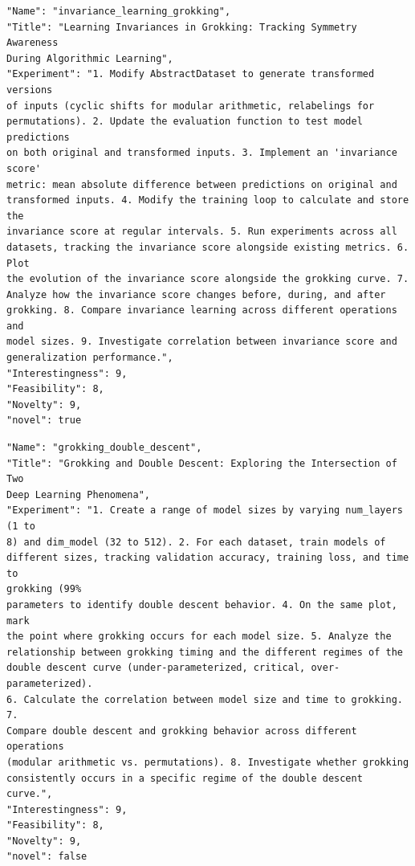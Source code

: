\documentclass[11pt, a4paper]{include/gdm_format}
\begin{document}
\begin{tcolorbox}[breakable,colback=blue!5!white, colframe=blue!75!black, title=Idea 23/50 - \texttt{invariance\_learning\_grokking}]
\small
\begin{verbatim}
"Name": "invariance_learning_grokking",
"Title": "Learning Invariances in Grokking: Tracking Symmetry Awareness
During Algorithmic Learning",
"Experiment": "1. Modify AbstractDataset to generate transformed versions
of inputs (cyclic shifts for modular arithmetic, relabelings for
permutations). 2. Update the evaluation function to test model predictions
on both original and transformed inputs. 3. Implement an 'invariance score'
metric: mean absolute difference between predictions on original and
transformed inputs. 4. Modify the training loop to calculate and store the
invariance score at regular intervals. 5. Run experiments across all
datasets, tracking the invariance score alongside existing metrics. 6. Plot
the evolution of the invariance score alongside the grokking curve. 7.
Analyze how the invariance score changes before, during, and after
grokking. 8. Compare invariance learning across different operations and
model sizes. 9. Investigate correlation between invariance score and
generalization performance.",
"Interestingness": 9,
"Feasibility": 8,
"Novelty": 9,
"novel": true
\end{verbatim}
\end{tcolorbox}

\begin{tcolorbox}[breakable,colback=blue!5!white, colframe=blue!75!black, title=Idea 24/50 - \texttt{grokking\_double\_descent}]
\small
\begin{verbatim}
"Name": "grokking_double_descent",
"Title": "Grokking and Double Descent: Exploring the Intersection of Two
Deep Learning Phenomena",
"Experiment": "1. Create a range of model sizes by varying num_layers (1 to
8) and dim_model (32 to 512). 2. For each dataset, train models of
different sizes, tracking validation accuracy, training loss, and time to
grokking (99%
parameters to identify double descent behavior. 4. On the same plot, mark
the point where grokking occurs for each model size. 5. Analyze the
relationship between grokking timing and the different regimes of the
double descent curve (under-parameterized, critical, over-parameterized).
6. Calculate the correlation between model size and time to grokking. 7.
Compare double descent and grokking behavior across different operations
(modular arithmetic vs. permutations). 8. Investigate whether grokking
consistently occurs in a specific regime of the double descent curve.",
"Interestingness": 9,
"Feasibility": 8,
"Novelty": 9,
"novel": false
\end{verbatim}
\end{tcolorbox}
\end{document}
